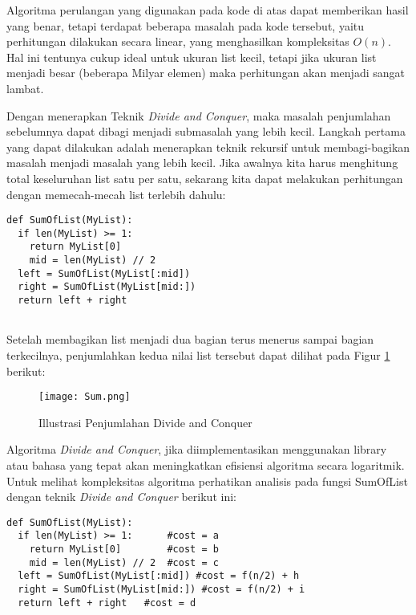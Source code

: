 \documentclass[12pt]{book}%
\begin{document}
Algoritma perulangan yang digunakan pada kode di atas dapat memberikan hasil yang benar, tetapi terdapat beberapa masalah pada kode tersebut, yaitu perhitungan dilakukan secara linear, yang menghasilkan kompleksitas $O(n)$. Hal ini tentunya cukup ideal untuk ukuran list kecil, tetapi jika ukuran list menjadi besar (beberapa Milyar elemen) maka perhitungan akan menjadi sangat lambat.

Dengan menerapkan Teknik \textit{Divide and Conquer}, maka masalah penjumlahan sebelumnya dapat dibagi menjadi submasalah yang lebih kecil. Langkah pertama yang dapat dilakukan adalah menerapkan teknik rekursif untuk membagi-bagikan masalah menjadi masalah yang lebih kecil. Jika awalnya kita harus menghitung total keseluruhan list satu per satu, sekarang kita dapat melakukan perhitungan dengan memecah-mecah list terlebih dahulu:

\lstset{language=Python}
\label{lst:DivideAndConquerSum}
\begin{lstlisting}[frame=single]
def SumOfList(MyList):
  if len(MyList) >= 1:
    return MyList[0] 
	mid = len(MyList) // 2
  left = SumOfList(MyList[:mid])
  right = SumOfList(MyList[mid:])
  return left + right
	
\end{lstlisting}

Setelah membagikan list menjadi dua bagian terus menerus sampai bagian terkecilnya, penjumlahkan kedua nilai list tersebut dapat dilihat pada Figur \ref{fig:DivideAndConquerSum} berikut:

\begin{figure}[htbp]
\begin{center}
	\texttt{[image: Sum.png]}%
	\caption{Illustrasi Penjumlahan Divide and Conquer}%
	\label{fig:DivideAndConquerSum}%
\end{center}
\end{figure}

Algoritma \textit{Divide and Conquer}, jika diimplementasikan menggunakan library atau bahasa yang tepat akan meningkatkan efisiensi algoritma secara logaritmik. Untuk melihat kompleksitas algoritma perhatikan analisis pada fungsi SumOfList dengan teknik \textit{Divide and Conquer} berikut ini:

\lstset{language=Python}
\label{lst:DivideAndConquerSum}
\begin{lstlisting}[frame=single]
def SumOfList(MyList):
  if len(MyList) >= 1:		#cost = a 
    return MyList[0]		#cost = b 
	mid = len(MyList) // 2	#cost = c
  left = SumOfList(MyList[:mid]) #cost = f(n/2) + h
  right = SumOfList(MyList[mid:]) #cost = f(n/2) + i
  return left + right	#cost = d
	
\end{lstlisting}
\end{document}
